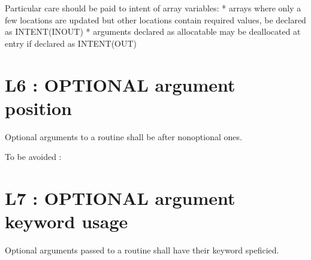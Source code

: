 \documentclass[letterpaper,10pt,english]{sphinxmanual}
\begin{document}
\sphinxAtStartPar
{}
Particular care should be paid to intent of array variables:
* arrays where only a few locations are updated but other locations
contain required values,  be declared as INTENT(INOUT)
* arguments declared as allocatable may be deallocated at entry if declared as INTENT(OUT)

\sphinxstepscope


\section{L6 : OPTIONAL argument position}
\label{\detokenize{rules/L6:l6-optional-argument-position}}\label{\detokenize{rules/L6::doc}}
\sphinxAtStartPar
Optional arguments to a routine shall be after non\sphinxhyphen{}optional ones.

\sphinxAtStartPar
To be avoided :
\def\sphinxLiteralBlockLabel{\label{\detokenize{rules/L6:id1}}}
\begin{sphinxVerbatim}[commandchars=\\\{\}]

\end{sphinxVerbatim}

\sphinxstepscope


\section{L7 : OPTIONAL argument keyword usage}
\label{\detokenize{rules/L7:l7-optional-argument-keyword-usage}}\label{\detokenize{rules/L7::doc}}
\sphinxAtStartPar
Optional arguments passed to a routine shall have their keyword speficied.
\end{document}
